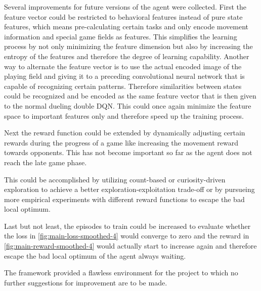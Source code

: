 Several improvements for future versions of the agent were collected. First the feature vector could be restricted to behavioral features instead of pure state features, which means pre-calculating certain tasks and only encode movement information and special game fields as features. This simplifies the learning process by not only minimizing the feature dimension but also by increasing the entropy of the features and therefore the degree of learning capability. Another way to alternate the feature vector is to use the actual encoded image of the playing field and giving it to a preceding convolutional neural network that is capable of recognizing certain patterns. Therefore similarities between states could be recognized and be encoded as the same feature vector that is then given to the normal dueling double DQN. This could once again minimize the feature space to important features only and therefore speed up the training process. 

Next the reward function could be extended by dynamically adjusting certain rewards during the progress of a game like increasing the movement reward towards opponents. This has not become important so far as the agent does not reach the late game phase. 

This could be accomplished by utilizing count-based or curiosity-driven exploration to achieve a better exploration-exploitation trade-off or by pursueing more empirical experiments with different reward functions to escape the bad local optimum. 

Last but not least, the episodes to train could be increased to evaluate whether the loss in \autoref{fig:main-loss-smoothed-4} would converge to zero and the reward in \autoref{fig:main-reward-smoothed-4} would actually start to increase again and therefore escape the bad local optimum of the agent always waiting. 

The framework provided a flawless environment for the project to which no further suggestions for improvement are to be made.
